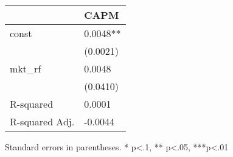 \begin{table}
\caption{}
\label{}
\begin{center}
\begin{tabular}{ll}
\hline
               & CAPM      \\
\hline
const          & 0.0048**  \\
               & (0.0021)  \\
mkt\_rf        & 0.0048    \\
               & (0.0410)  \\
R-squared      & 0.0001    \\
R-squared Adj. & -0.0044   \\
\hline
\end{tabular}
\end{center}
\end{table}
\bigskip
Standard errors in parentheses. \newline 
* p<.1, ** p<.05, ***p<.01
